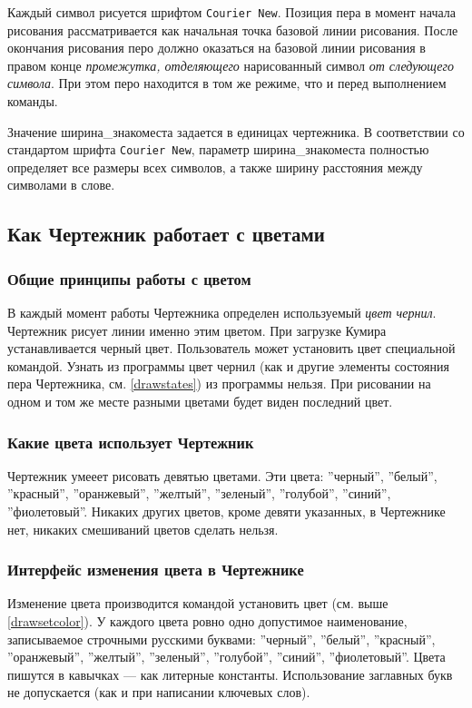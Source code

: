 \documentclass[12pt,a4paper]{article}
\begin{document}
Каждый символ рисуется шрифтом \texttt{Courier New}. Позиция пера в момент начала рисования рассматривается как начальная точка базовой линии рисования.  После окончания рисования перо должно оказаться на базовой линии рисования в правом конце \emph{промежутка, отделяющего} нарисованный символ \emph{от следующего символа}. При этом перо находится в том же режиме, что и перед выполнением команды.

Значение \textsf{ширина\_знакоместа} задается в единицах чертежника. В соответствии со стандартом шрифта \texttt{Courier New}, параметр \textsf{ширина\_знакоместа} полностью определяет все размеры всех символов, а также ширину расстояния между символами в слове.

\subsection{Как Чертежник работает с цветами}
\label{drawcolors}

\subsubsection{Общие принципы работы с цветом}

	В каждый момент работы Чертежника определен используемый \emph{цвет чернил}. Чертежник рисует линии именно этим цветом. При загрузке Кумира устанавливается черный цвет. 	Пользователь может установить цвет специальной командой. Узнать из программы цвет чернил (как и другие элементы состояния пера Чертежника, см. \ref{drawstates}) из программы нельзя. При рисовании на одном и том же месте разными цветами будет виден последний цвет. 

\subsubsection{Какие цвета использует Чертежник}

	Чертежник умееет рисовать девятью цветами. Эти цвета: \mbox{''черный''}, ''белый'', ''красный'', ''оранжевый'', ''желтый'', ''зеленый'', ''голубой'', ''синий'', ''фиолетовый''. Никаких других цветов, кроме девяти указанных, в Чертежнике нет,  никаких смешиваний цветов сделать нельзя.

\subsubsection{Интерфейс изменения цвета в Чертежнике}

	Изменение цвета производится командой \textsf{установить цвет} (см. выше \ref{drawsetcolor}).
У каждого цвета ровно одно допустимое наименование, записываемое строчными русскими буквами:  \mbox{''черный''}, ''белый'', ''красный'', ''оранжевый'', ''желтый'', ''зеленый'', ''голубой'', ''синий'', ''фиолетовый''. Цвета пишутся в кавычках --- как литерные константы. Использование заглавных букв не допускается (как и при написании ключевых слов).
\end{document}
